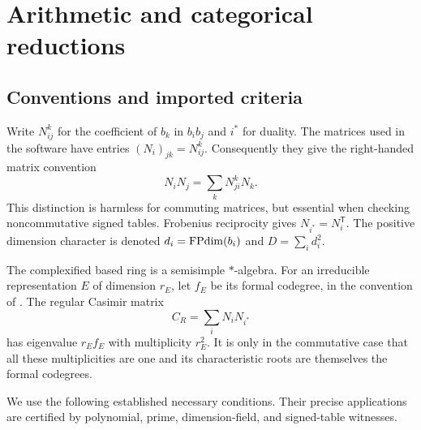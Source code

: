 \section{Arithmetic and categorical reductions}\label{sec:reductions}
\subsection{Conventions and imported criteria}\label{sec:inputs}
Write $N_{ij}^{k}$ for the coefficient of $b_k$ in $b_i b_j$ and $i^*$
for duality. The matrices used in the software have entries
$(N_i)_{jk}=N_{ij}^{k}$. Consequently they give the right-handed matrix
convention
\[
N_iN_j=\sum_k N_{ji}^{k}N_k.
\]
This distinction is harmless for commuting matrices, but essential when
checking noncommutative signed tables. Frobenius reciprocity gives
$N_{i^*}=N_i^{\mathsf T}$.
The positive dimension character is denoted $d_i=\operatorname{FPdim}(b_i)$ and
$D=\sum_i d_i^2$.

The complexified based ring is a semisimple $*$-algebra. For an
irreducible representation $E$ of dimension $r_E$, let $f_E$ be its
formal codegree, in the convention of \cite{Ocode}. The regular
Casimir matrix
\[
C_R=\sum_i N_iN_{i^*}
\]
has eigenvalue $r_Ef_E$ with multiplicity $r_E^2$. It is only in the
commutative case that all these multiplicities are one and its
characteristic roots are themselves the formal codegrees.

We use the following established necessary conditions. Their precise
applications are certified by polynomial, prime, dimension-field, and
signed-table witnesses.

